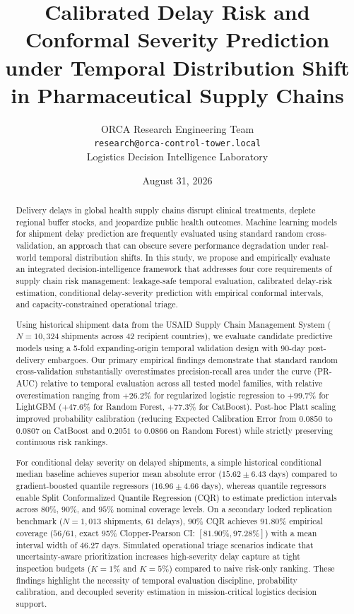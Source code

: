 \documentclass[11pt,a4paper]{article}
\title{\textbf{Calibrated Delay Risk and Conformal Severity Prediction under Temporal Distribution Shift in Pharmaceutical Supply Chains}}
\author{
  ORCA Research Engineering Team\\
  \texttt{research@orca-control-tower.local}\\
  Logistics Decision Intelligence Laboratory
}
\date{August 31, 2026}
\begin{document}
\maketitle

\begin{abstract}
Delivery delays in global health supply chains disrupt clinical treatments, deplete regional buffer stocks, and jeopardize public health outcomes. Machine learning models for shipment delay prediction are frequently evaluated using standard random cross-validation, an approach that can obscure severe performance degradation under real-world temporal distribution shifts. In this study, we propose and empirically evaluate an integrated decision-intelligence framework that addresses four core requirements of supply chain risk management: leakage-safe temporal evaluation, calibrated delay-risk estimation, conditional delay-severity prediction with empirical conformal intervals, and capacity-constrained operational triage. 

Using historical shipment data from the USAID Supply Chain Management System ($N = 10,324$ shipments across 42 recipient countries), we evaluate candidate predictive models using a 5-fold expanding-origin temporal validation design with 90-day post-delivery embargoes. Our primary empirical findings demonstrate that standard random cross-validation substantially overestimates precision-recall area under the curve (PR-AUC) relative to temporal evaluation across all tested model families, with relative overestimation ranging from $+26.2\%$ for regularized logistic regression to $+99.7\%$ for LightGBM ($+47.6\%$ for Random Forest, $+77.3\%$ for CatBoost). Post-hoc Platt scaling improved probability calibration (reducing Expected Calibration Error from $0.0850$ to $0.0807$ on CatBoost and $0.2051$ to $0.0866$ on Random Forest) while strictly preserving continuous risk rankings. 

For conditional delay severity on delayed shipments, a simple historical conditional median baseline achieves superior mean absolute error ($15.62 \pm 6.43$ days) compared to gradient-boosted quantile regressors ($16.96 \pm 4.66$ days), whereas quantile regressors enable Split Conformalized Quantile Regression (CQR) to estimate prediction intervals across $80\%$, $90\%$, and $95\%$ nominal coverage levels. On a secondary locked replication benchmark ($N = 1,013$ shipments, $61$ delays), $90\%$ CQR achieves $91.80\%$ empirical coverage ($56/61$, exact 95\% Clopper-Pearson CI: $[81.90\%, 97.28\%]$) with a mean interval width of $46.27$ days. Simulated operational triage scenarios indicate that uncertainty-aware prioritization increases high-severity delay capture at tight inspection budgets ($K = 1\%$ and $K = 5\%$) compared to naive risk-only ranking. These findings highlight the necessity of temporal evaluation discipline, probability calibration, and decoupled severity estimation in mission-critical logistics decision support.
\end{abstract}
\end{document}
